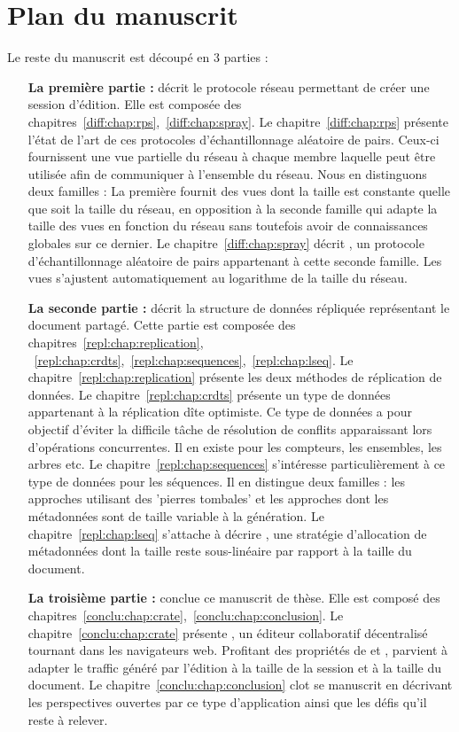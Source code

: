 
\section{Plan du manuscrit}

Le reste du manuscrit est découpé en 3 parties :

\begin{itemize}
\item [\textbf{La première partie :}] décrit le protocole réseau permettant de
  créer une session d'édition. Elle est composée des
  chapitres~\ref{diff:chap:rps},~\ref{diff:chap:spray}. Le
  chapitre~\ref{diff:chap:rps} présente l'état de l'art de ces protocoles
  d'échantillonnage aléatoire de pairs. Ceux-ci fournissent une vue partielle du
  réseau à chaque membre laquelle peut être utilisée afin de communiquer à
  l'ensemble du réseau. Nous en distinguons deux familles : La première fournit
  des vues dont la taille est constante quelle que soit la taille du réseau, en
  opposition à la seconde famille qui adapte la taille des vues en fonction du
  réseau sans toutefois avoir de connaissances globales sur ce dernier. Le
  chapitre~\ref{diff:chap:spray} décrit \SPRAY, un protocole d'échantillonnage
  aléatoire de pairs appartenant à cette seconde famille. Les vues s'ajustent
  automatiquement au logarithme de la taille du réseau.
\item [\textbf{La seconde partie :}] décrit la structure de données répliquée
  représentant le document partagé. Cette partie est composée des
  chapitres~\ref{repl:chap:replication},
  ~\ref{repl:chap:crdts},~\ref{repl:chap:sequences},~\ref{repl:chap:lseq}. Le
  chapitre~\ref{repl:chap:replication} présente les deux méthodes de réplication
  de données. Le chapitre~\ref{repl:chap:crdts} présente un type de données
  appartenant à la réplication dîte optimiste. Ce type de données a pour
  objectif d'éviter la difficile tâche de résolution de conflits apparaissant
  lors d'opérations concurrentes. Il en existe pour les compteurs, les
  ensembles, les arbres etc. Le chapitre~\ref{repl:chap:sequences} s'intéresse
  particulièrement à ce type de données pour les séquences. Il en distingue deux
  familles : les approches utilisant des 'pierres tombales' et les approches
  dont les métadonnées sont de taille variable à la génération. Le
  chapitre~\ref{repl:chap:lseq} s'attache à décrire \LSEQ, une stratégie
  d'allocation de métadonnées dont la taille reste sous-linéaire par rapport à
  la taille du document.
\item [\textbf{La troisième partie :}] conclue ce manuscrit de thèse. Elle est
  composé des
  chapitres~\ref{conclu:chap:crate},~\ref{conclu:chap:conclusion}. Le
  chapitre~\ref{conclu:chap:crate} présente \CRATE, un éditeur collaboratif
  décentralisé tournant dans les navigateurs web. Profitant des propriétés de
  \SPRAY et \LSEQ, \CRATE parvient à adapter le traffic généré par l'édition à
  la taille de la session et à la taille du document. Le
  chapitre~\ref{conclu:chap:conclusion} clot se manuscrit en décrivant les
  perspectives ouvertes par ce type d'application ainsi que les défis qu'il
  reste à relever.
\end{itemize}



